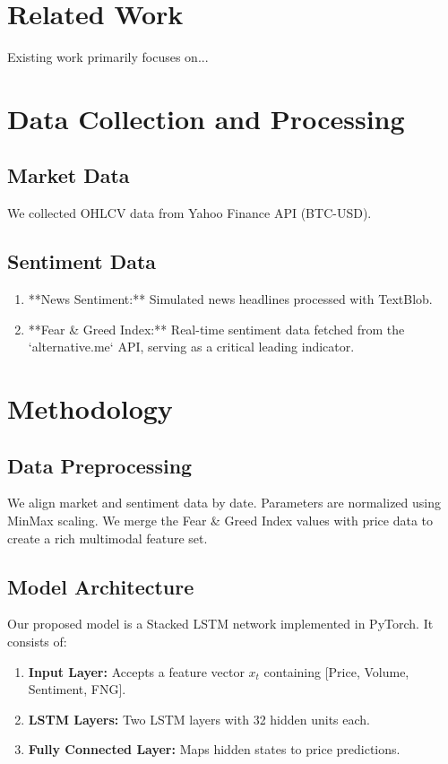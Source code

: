 \documentclass[conference]{IEEEtran}
\begin{document}
\section{Related Work}
Existing work primarily focuses on...

\section{Data Collection and Processing}
\subsection{Market Data}
We collected OHLCV data from Yahoo Finance API (BTC-USD).

\subsection{Sentiment Data}
\begin{enumerate}
    \item **News Sentiment:** Simulated news headlines processed with TextBlob.
    \item **Fear & Greed Index:** Real-time sentiment data fetched from the `alternative.me` API, serving as a critical leading indicator.
\end{enumerate}

\section{Methodology}
\subsection{Data Preprocessing}
We align market and sentiment data by date. Parameters are normalized using MinMax scaling. We merge the Fear & Greed Index values with price data to create a rich multimodal feature set.

\subsection{Model Architecture}
Our proposed model is a Stacked LSTM network implemented in PyTorch. It consists of:
\begin{enumerate}
    \item \textbf{Input Layer:} Accepts a feature vector $x_t$ containing [Price, Volume, Sentiment, FNG].
    \item \textbf{LSTM Layers:} Two LSTM layers with 32 hidden units each.
    \item \textbf{Fully Connected Layer:} Maps hidden states to price predictions.
\end{enumerate}
\end{document}
